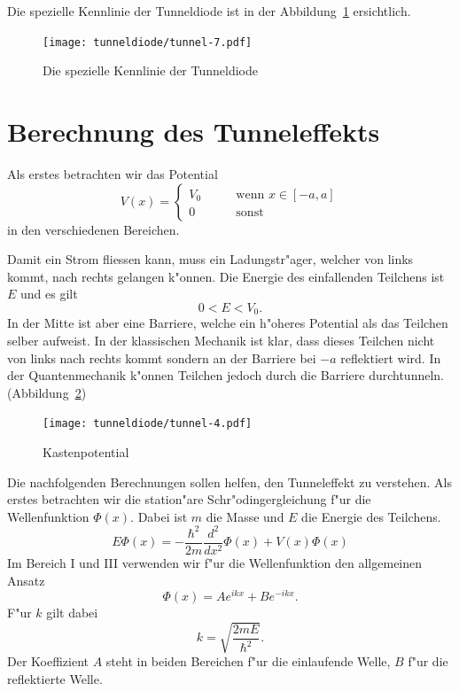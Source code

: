 \begin{refsection}
Die spezielle Kennlinie der Tunneldiode ist in der Abbildung~\ref{tunnel:Tunneldiode} ersichtlich.

\begin{figure}	%
\centering
\texttt{[image: tunneldiode/tunnel-7.pdf]}
\caption{Die spezielle Kennlinie der Tunneldiode
\label{tunnel:Tunneldiode}}
\end{figure}

\section{Berechnung des Tunneleffekts}
Als erstes betrachten wir das Potential 
\[
V(x)=\begin{cases}
V_0& \qquad \text{wenn } x \in [-a,a]\\
0&   \qquad \text{sonst}
\end{cases}
\]
in den verschiedenen Bereichen.

Damit ein Strom fliessen kann, muss ein Ladungstr"ager, welcher von links kommt, nach rechts gelangen k"onnen. 
Die Energie des einfallenden Teilchens ist $E$ und es gilt
\[
0 < E < V_0.
\]
In der Mitte ist aber eine Barriere, welche ein h"oheres Potential als das Teilchen selber aufweist. 
In der klassischen Mechanik ist klar, dass dieses Teilchen nicht von links nach rechts kommt sondern an der Barriere bei $-a$ reflektiert wird. 
In der Quantenmechanik k"onnen Teilchen jedoch durch die Barriere durchtunneln. (Abbildung~\ref{tunnel:Kastenpotential})

\begin{figure}	%
\centering
\texttt{[image: tunneldiode/tunnel-4.pdf]}
\caption{Kastenpotential
\label{tunnel:Kastenpotential}}
\end{figure}

Die nachfolgenden Berechnungen sollen helfen, den Tunneleffekt zu verstehen.  
Als erstes betrachten wir die station"are Schr"odingergleichung f"ur die Wellenfunktion $\Phi(x)$. 
Dabei ist $m$ die Masse und $E$ die Energie des Teilchens.
\[
E\Phi(x) = -\frac{\hbar^2}{2m}\frac{d^2}{dx^2}\Phi(x) + V(x)\Phi(x)
\]
Im Bereich \textrm{I} und \textrm{III} verwenden wir f"ur die Wellenfunktion den allgemeinen Ansatz
\[
\Phi(x) = Ae^{ikx}+Be^{-ikx}.
\]
F"ur $k$ gilt dabei
\[
k = \sqrt{\frac{2mE}{\hbar^2}}.
\]
Der Koeffizient $A$ steht in beiden Bereichen f"ur die einlaufende Welle, $B$ f"ur die reflektierte Welle.


\end{refsection}
